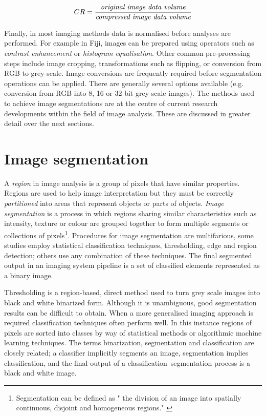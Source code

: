 \begin{equation}
CR = \frac{\emph{original image data volume}}{\emph{compressed image data volume}} \label{eqn:CR}
\end{equation}

Finally, in most imaging methods data is normalised before analyses are performed. For example in Fiji, images can be prepared using operators such as \emph{contrast enhancement} or \emph{histogram equalisation}. Other common pre-processing steps include image cropping, transformations such as flipping, or conversion from \ac{RGB} to grey-scale. Image conversions are frequently required before segmentation operations can be applied. There are generally several options available (e.g. conversion from \ac{RGB} into 8, 16 or 32 bit grey-scale images). The methods used to achieve image segmentations are at the centre of current research developments within the field of image analysis. These are discussed in greater detail over the next sections.

\section{Image segmentation}\label{sec:image-segmentation}
A \emph{region} in image analysis is a group of pixels that have similar properties. Regions are used to help image interpretation but they must be correctly \emph{partitioned} into areas that represent objects or parts of objects. \emph{Image segmentation} is a process in which regions sharing similar characteristics such as intensity, texture  or colour are grouped together to form multiple segments or collections of pixels\footnote{Segmentation can be defined as " the division of an image into spatially continuous, disjoint and homogeneous regions." \cite[pg.215]{Blaschke2004}}. Procedures for image segmentation are multifarious, some studies employ statistical classification techniques, thresholding, edge and region detection; others use any combination of these techniques. The final segmented output in an imaging system pipeline is a set of classified elements represented as a binary image. 

Thresholding is a region-based, direct method used to turn grey scale images into black and white binarized form. Although it is unambiguous, good segmentation results can be difficult to obtain. When a more generalised imaging approach is required classification techniques often perform well. In this instance regions of pixels are sorted into classes by way of statistical methods or algorithmic machine learning techniques. The terms binarization, segmentation and classification are closely related; a classifier implicitly segments an image, segmentation implies classification, and the final output of a classification--segmentation process is a black and white image.

